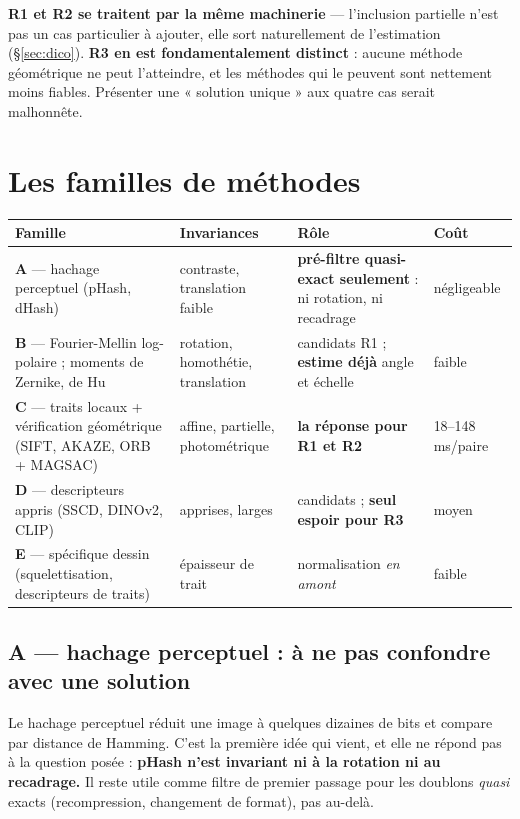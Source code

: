 \documentclass[11pt,a4paper]{article}
\newcommand{\aretenir}[1]{%
  \par\medskip
  \noindent\colorbox{encadre}{%
    \begin{minipage}{\dimexpr\linewidth-2\fboxsep}
      \vspace{2pt}#1\vspace{2pt}
    \end{minipage}}%
  \par\medskip
}
\newcommand{\alerte}[1]{\textcolor{alerte}{\textbf{#1}}}
\newcommand{\bon}[1]{\textcolor{vert}{\textbf{#1}}}
\begin{document}
\aretenir{\textbf{R1 et R2 se traitent par la même machinerie} — l'inclusion
partielle n'est pas un cas particulier à ajouter, elle sort naturellement de
l'estimation (§\ref{sec:dico}). \alerte{R3 en est fondamentalement distinct} :
aucune méthode géométrique ne peut l'atteindre, et les méthodes qui le peuvent
sont nettement moins fiables. Présenter une « solution unique » aux quatre cas
serait malhonnête.}

\section{Les familles de méthodes}
\label{sec:familles}

\begin{table}[h]
\centering\small
\begin{tabularx}{\textwidth}{F{2.5cm}YYF{2.1cm}}
\toprule
\textbf{Famille} & \textbf{Invariances} & \textbf{Rôle} & \textbf{Coût} \\
\midrule
\textbf{A} — hachage perceptuel
  (pHash, dHash) & contraste, translation faible
  & \alerte{pré-filtre quasi-exact seulement} : ni rotation, ni recadrage
  & négligeable \\
\addlinespace
\textbf{B} — Fourier-Mellin log-polaire ; moments de Zernike, de Hu
  & rotation, homothétie, translation
  & candidats R1 ; \textbf{estime déjà} angle et échelle
  & faible \\
\addlinespace
\textbf{C} — traits locaux + vérification géométrique
  (SIFT, AKAZE, ORB + MAGSAC) & affine, partielle, photométrique
  & \bon{la réponse pour R1 et R2} & 18--148 ms/paire \\
\addlinespace
\textbf{D} — descripteurs appris (SSCD, DINOv2, CLIP)
  & apprises, larges & candidats ; \textbf{seul espoir pour R3} & moyen \\
\addlinespace
\textbf{E} — spécifique dessin (squelettisation, descripteurs de traits)
  & épaisseur de trait & normalisation \emph{en amont} & faible \\
\bottomrule
\end{tabularx}
\end{table}

\subsection{A — hachage perceptuel : à ne pas confondre avec une solution}

Le hachage perceptuel réduit une image à quelques dizaines de bits et compare
par distance de Hamming. C'est la première idée qui vient, et elle ne répond
pas à la question posée : \alerte{pHash n'est invariant ni à la rotation ni au
recadrage.} Il reste utile comme filtre de premier passage pour les doublons
\emph{quasi} exacts (recompression, changement de format), pas au-delà.
\end{document}
